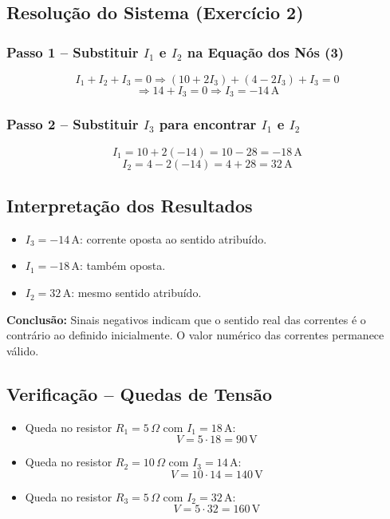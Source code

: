 \subsection{Resolução do Sistema (Exercício 2)}

\subsubsection{Passo 1 – Substituir $I_1$ e $I_2$ na Equação dos Nós (3)}

\[
I_1 + I_2 + I_3 = 0
\Rightarrow (10 + 2I_3) + (4 - 2I_3) + I_3 = 0
\]
\[
\Rightarrow 14 + I_3 = 0 \Rightarrow I_3 = -14\,\text{A}
\]

\subsubsection{Passo 2 – Substituir $I_3$ para encontrar $I_1$ e $I_2$}

\[
I_1 = 10 + 2(-14) = 10 - 28 = -18\,\text{A}
\]
\[
I_2 = 4 - 2(-14) = 4 + 28 = 32\,\text{A}
\]

\subsection{Interpretação dos Resultados}

\begin{itemize}
    \item $I_3 = -14\,\text{A}$: corrente oposta ao sentido atribuído.
    \item $I_1 = -18\,\text{A}$: também oposta.
    \item $I_2 = 32\,\text{A}$: mesmo sentido atribuído.
\end{itemize}

\textbf{Conclusão:} Sinais negativos indicam que o sentido real das correntes é o contrário ao definido inicialmente. O valor numérico das correntes permanece válido.

\subsection{Verificação – Quedas de Tensão}

\begin{itemize}
    \item Queda no resistor $R_1 = 5\,\Omega$ com $I_1 = 18\,\text{A}$:
    \[
    V = 5 \cdot 18 = 90\,\text{V}
    \]
    \item Queda no resistor $R_2 = 10\,\Omega$ com $I_3 = 14\,\text{A}$:
    \[
    V = 10 \cdot 14 = 140\,\text{V}
    \]
    \item Queda no resistor $R_3 = 5\,\Omega$ com $I_2 = 32\,\text{A}$:
    \[
    V = 5 \cdot 32 = 160\,\text{V}
    \]
\end{itemize}


